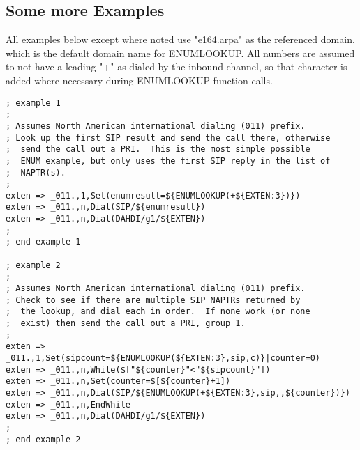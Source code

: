 \subsection{Some more Examples}

All examples below except where noted use "e164.arpa" as the
referenced domain, which is the default domain name for ENUMLOOKUP.
All numbers are assumed to not have a leading "+" as dialed by the
inbound channel, so that character is added where necessary during
ENUMLOOKUP function calls.

\begin{astlisting}
\begin{verbatim}
; example 1
;
; Assumes North American international dialing (011) prefix.
; Look up the first SIP result and send the call there, otherwise
;  send the call out a PRI.  This is the most simple possible
;  ENUM example, but only uses the first SIP reply in the list of
;  NAPTR(s).
;
exten => _011.,1,Set(enumresult=${ENUMLOOKUP(+${EXTEN:3})})
exten => _011.,n,Dial(SIP/${enumresult})
exten => _011.,n,Dial(DAHDI/g1/${EXTEN})
;
; end example 1

; example 2
;
; Assumes North American international dialing (011) prefix.
; Check to see if there are multiple SIP NAPTRs returned by
;  the lookup, and dial each in order.  If none work (or none
;  exist) then send the call out a PRI, group 1.
;
exten => _011.,1,Set(sipcount=${ENUMLOOKUP(${EXTEN:3},sip,c)}|counter=0)
exten => _011.,n,While($["${counter}"<"${sipcount}"])
exten => _011.,n,Set(counter=$[${counter}+1])
exten => _011.,n,Dial(SIP/${ENUMLOOKUP(+${EXTEN:3},sip,,${counter})})
exten => _011.,n,EndWhile
exten => _011.,n,Dial(DAHDI/g1/${EXTEN})
;
; end example 2


\end{verbatim}
\end{astlisting}
